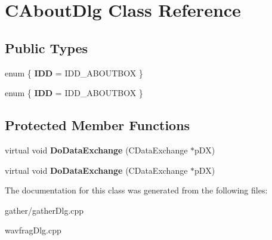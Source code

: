 \hypertarget{class_c_about_dlg}{\section{C\-About\-Dlg Class Reference}
\label{class_c_about_dlg}
}
\subsection*{Public Types}
\begin{DoxyCompactItemize}
\item 
enum \{ {\bfseries I\-D\-D} =  I\-D\-D\-\_\-\-A\-B\-O\-U\-T\-B\-O\-X
 \}
\item 
enum \{ {\bfseries I\-D\-D} =  I\-D\-D\-\_\-\-A\-B\-O\-U\-T\-B\-O\-X
 \}
\end{DoxyCompactItemize}
\subsection*{Protected Member Functions}
\begin{DoxyCompactItemize}
\item 
\hypertarget{class_c_about_dlg_ab83db7484fec957282d7d5a21aed4df4}{virtual void {\bfseries Do\-Data\-Exchange} (C\-Data\-Exchange $\ast$p\-D\-X)}\label{class_c_about_dlg_ab83db7484fec957282d7d5a21aed4df4}

\item 
\hypertarget{class_c_about_dlg_a18b361b8d48610a7fd345c6b078a2223}{virtual void {\bfseries Do\-Data\-Exchange} (C\-Data\-Exchange $\ast$p\-D\-X)}\label{class_c_about_dlg_a18b361b8d48610a7fd345c6b078a2223}

\end{DoxyCompactItemize}


The documentation for this class was generated from the following files\-:\begin{DoxyCompactItemize}
\item 
gather/gather\-Dlg.\-cpp\item 
wavfrag\-Dlg.\-cpp\end{DoxyCompactItemize}
